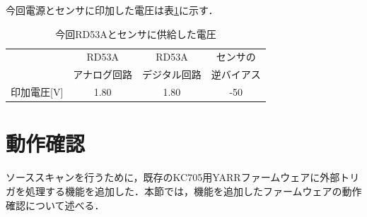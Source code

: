 今回電源とセンサに印加した電圧は表\ref{tab:voltage}に示す．

\begin{table}[h]
  \centering
  \caption{今回RD53Aとセンサに供給した電圧}
  \begin{tabular} {l|cc|c} \hline
     & RD53A & RD53A & センサの \\ 
     & アナログ回路 & デジタル回路 & 逆バイアス \\ \hline \hline
    印加電圧[$\mathrm{V}$] & 1.80 & 1.80 & -50 \\ \hline
  \end{tabular}
  \label{tab:voltage}
\end{table}



\section{動作確認}
\label{sec:scans}
ソーススキャンを行うために，既存のKC705用YARRファームウェアに外部トリガを処理する機能を追加した．本節では，機能を追加したファームウェアの動作確認について述べる．

%
%
